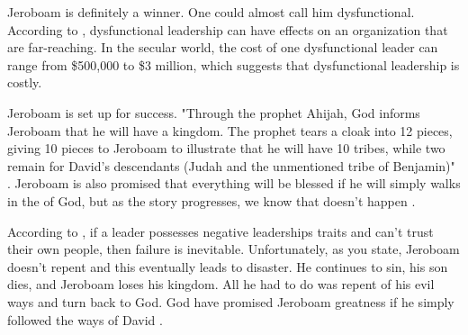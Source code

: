 \documentclass[man]{apa7}
\begin{document}
\setlength{\parindent}{0.5in}
Jeroboam is definitely a winner. One could almost call him dysfunctional. According to \textcite{simonet_dark-side_2018}, dysfunctional leadership can have effects on an organization that are far-reaching. In the secular world, the cost of one dysfunctional leader can range from \$500,000 to \$3 million, which suggests that dysfunctional leadership is costly.

\setlength{\parindent}{0.5in}
Jeroboam is set up for success. "Through the prophet Ahijah, God informs Jeroboam that he will have a
kingdom. The prophet tears a cloak into 12 pieces, giving 10 pieces
to Jeroboam to illustrate that he will have 10 tribes, while two remain for David’s descendants (Judah and the unmentioned tribe of Benjamin)" \parencite[p. 68]{Merida2015}. Jeroboam is also promised that everything will be blessed if he will simply walks in the of God, but as the story progresses, we know that doesn't happen \parencite{bible}.  

\setlength{\parindent}{0.5in}
According to \textcite{cialdini_how_2019}, if a leader possesses negative leaderships traits and can't trust their own people, then failure is inevitable. Unfortunately, as you state, Jeroboam doesn't repent and this eventually leads to disaster. He continues to sin, his son dies, and Jeroboam loses his kingdom. All he had to do was repent of his evil ways and turn back to God. God have promised Jeroboam greatness if he simply followed the ways of David \parencite{Merida2015}.




\printbibliography
\end{document}
